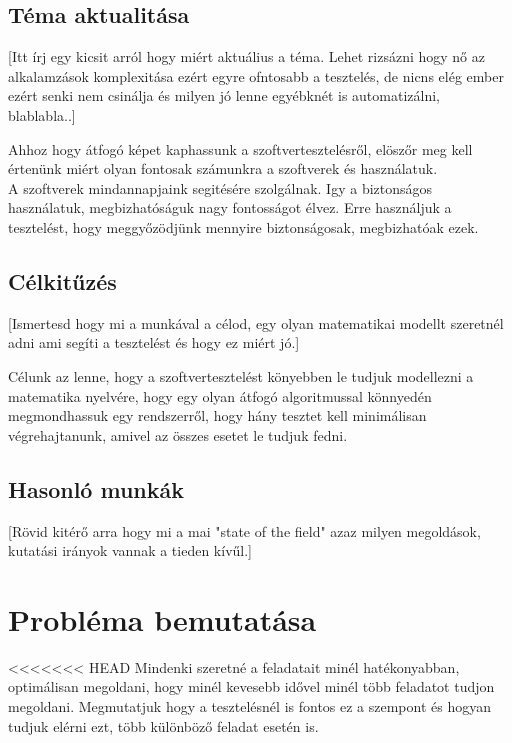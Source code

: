 \documentclass[12pt]{article}
\begin{document}
\subsection{Téma aktualitása}
[Itt írj egy kicsit arról hogy miért aktuálius a téma. Lehet rizsázni hogy nő az alkalamzások komplexitása ezért egyre ofntosabb a tesztelés, de nicns elég ember ezért senki nem csinálja és milyen jó lenne egyébknét is automatizálni, blablabla..]

Ahhoz hogy átfogó képet kaphassunk a szoftvertesztelésről, elöszőr meg kell értenünk miért olyan fontosak számunkra a szoftverek és használatuk.\\ 
A szoftverek mindannapjaink segitésére szolgálnak. Igy a biztonságos használatuk, megbizhatóságuk nagy fontosságot élvez. Erre használjuk a tesztelést, hogy meggyőzödjünk mennyire biztonságosak, megbizhatóak ezek.\\





\subsection{Célkitűzés}
[Ismertesd hogy mi a munkával a célod,  egy olyan matematikai modellt szeretnél adni ami segíti a tesztelést és hogy ez miért jó.]

Célunk az lenne, hogy a szoftvertesztelést könyebben le tudjuk modellezni a matematika nyelvére, hogy egy olyan átfogó algoritmussal könnyedén megmondhassuk egy rendszerről, hogy hány tesztet kell minimálisan végrehajtanunk, amivel az összes esetet le tudjuk fedni.

\subsection{Hasonló munkák}
[Rövid kitérő arra hogy mi a mai "state of the field" azaz milyen megoldások, kutatási irányok vannak a tieden kívűl.]




\section{Probléma bemutatása}

<<<<<<< HEAD
Mindenki szeretné a feladatait minél hatékonyabban, optimálisan megoldani, hogy minél kevesebb idővel minél több feladatot tudjon megoldani. Megmutatjuk hogy a tesztelésnél is fontos ez a szempont és hogyan tudjuk elérni ezt, több különböző feladat esetén is.
\end{document}
